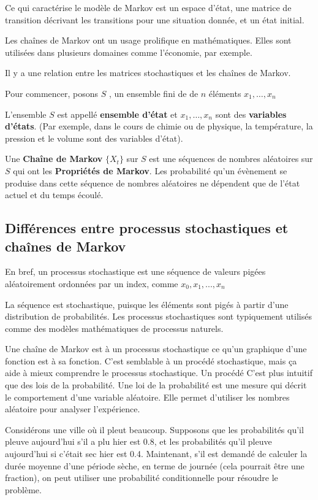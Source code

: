\documentclass[10pt]{article}
\begin{document}
Ce qui caractérise le modèle de Markov est un espace d'état,  une matrice de transition décrivant les transitions pour une situation donnée,  et un état initial\cite{Markov}.

Les chaînes de Markov ont un usage prolifique en mathématiques. Elles sont utilisées dans plusieurs domaines comme l'économie,  par exemple.



Il y a une relation entre les matrices stochastiques et les chaînes de Markov.

Pour commencer, posons $ S $ , un ensemble fini de de $ n $ éléments $ x_1, \ldots, x_n $ 

L'ensemble $ S $ est appellé \textbf{ensemble d'état} et $ x_1, \ldots, x_n $ sont des \textbf{variables d'états}. (Par exemple, dans le cours de chimie ou de physique, la température, la pression et le volume sont des variables d'état).

Une \textbf{Chaîne de Markov} $ \{X_t\} $ sur $ S $ est une séquences de nombres aléatoires sur $ S $ qui ont les \textbf{Propriétés de Markov}.  Les probabilité qu'un évènement se produise dans cette séquence de nombres aléatoires ne dépendent que de l'état actuel et du temps écoulé\cite{hockey}.


\subsection{Différences entre processus stochastiques et chaînes de Markov}

En bref, un processus stochastique est une séquence de valeurs pigées aléatoirement ordonnées par un index, comme ${x_0,x_1,...,x_n}$

La séquence est stochastique, puisque les éléments sont pigés à partir d'une distribution de probabilités. Les processus stochastiques sont typiquement utilisés comme des modèles mathématiques de processus naturels\cite{hockey}.


Une chaîne de Markov est à un processus stochastique ce qu'un graphique d'une fonction est à sa fonction. C'est semblable à un procédé stochastique, mais ça aide à mieux comprendre le processus stochastique. Un procédé
C'est plus intuitif que des lois de la probabilité. Une loi de la probabilité est une mesure qui décrit le comportement d'une variable aléatoire. Elle permet d'utiliser les nombres aléatoire pour analyser l'expérience\cite{Loiprob}.

Considérons une ville où il pleut beaucoup.  Supposons que les probabilités qu'il pleuve aujourd'hui s'il a plu hier est 0.8, et les probabilités qu'il pleuve aujourd'hui si c'était sec hier est 0.4. Maintenant, s'il est demandé de calculer la durée moyenne d'une période sèche, en terme de journée (cela pourrait être une fraction), on peut utiliser une probabilité conditionnelle pour résoudre le problème.
\end{document}
